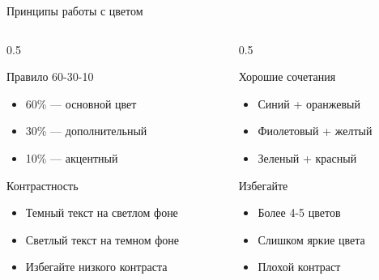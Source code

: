 \documentclass[aspectratio=169]{beamer}
\begin{document}
\begin{frame}{Принципы работы с цветом}
    \begin{columns}[T]
        \begin{column}{0.5\textwidth}
            \begin{block}{Правило 60-30-10}
                \begin{itemize}
                    \item 60\% — основной цвет
                    \item 30\% — дополнительный
                    \item 10\% — акцентный
                \end{itemize}
            \end{block}
            
            \vspace{0.3cm}
            
            \begin{block}{Контрастность}
                \begin{itemize}
                    \item Темный текст на светлом фоне
                    \item Светлый текст на темном фоне
                    \item Избегайте низкого контраста
                \end{itemize}
            \end{block}
        \end{column}
        
        \begin{column}{0.5\textwidth}
            \begin{exampleblock}{Хорошие сочетания}
                \begin{itemize}
                    \item Синий + оранжевый
                    \item Фиолетовый + желтый
                    \item Зеленый + красный
                \end{itemize}
            \end{exampleblock}
            
            \vspace{0.3cm}
            
            \begin{alertblock}{Избегайте}
                \begin{itemize}
                    \item Более 4-5 цветов
                    \item Слишком яркие цвета
                    \item Плохой контраст
                \end{itemize}
            \end{alertblock}
        \end{column}
    \end{columns}
\end{frame}
\end{document}
